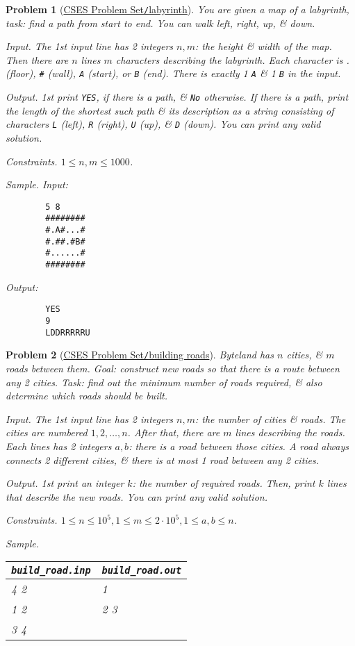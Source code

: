 \documentclass{article}
\newtheorem{problem}{Problem}
\begin{document}
\begin{problem}[\href{https://cses.fi/problemset/task/1193}{CSES Problem Set{\tt/}labyrinth}]
	You are given a map of a labyrinth, task: find a path from start to end. You can walk left, right, up, \& down.
	\item {\sf Input.} The 1st input line has 2 integers $n,m$: the height \& width of the map. Then there are $n$ lines $m$ characters describing the labyrinth. Each character is . (floor), {\tt\#} (wall), {\tt A} (start), or {\tt B} (end). There is exactly 1 {\tt A} \& 1 {\tt B} in the input.
	\item {\sf Output.} 1st print {\tt YES}, if there is a path, \& {\tt No} otherwise. If there is a path, print the length of the shortest such path \& its description as a string consisting of characters {\tt L} (left), {\tt R} (right), {\tt U} (up), \& {\tt D} (down). You can print any valid solution.
	\item {\sf Constraints.} $1\le n,m\le1000$.
	\item {\sf Sample.} Input:
	\begin{verbatim}
		5 8
		########
		#.A#...#
		#.##.#B#
		#......#
		########
	\end{verbatim}
	Output:
	\begin{verbatim}
		YES
		9
		LDDRRRRRU
	\end{verbatim}
\end{problem}

\begin{problem}[\href{https://cses.fi/problemset/task/1666}{CSES Problem Set{\tt/}building roads}]
	Byteland has $n$ cities, \& $m$ roads between them. Goal: construct new roads so that there is a route between any 2 cities. Task: find out the minimum number of roads required, \& also determine which roads should be built.
	\item {\sf Input.} The 1st input line has 2 integers $n,m$: the number of cities \& roads. The cities are numbered $1,2,\ldots,n$. After that, there are $m$ lines describing the roads. Each lines has 2 integers $a,b$: there is a road between those cities. A road always connects 2 different cities, \& there is at most 1 road between any 2 cities.
	\item {\sf Output.} 1st print an integer $k$: the number of required roads. Then, print $k$ lines that describe the new roads. You can print any valid solution.
	\item {\sf Constraints.} $1\le n\le10^5,1\le m\le2\cdot10^5,1\le a,b\le n$.
	\item {\sf Sample.}
	\begin{table}[H]
		\centering
		\begin{tabular}{|l|l|}
			\hline
			\verb|build_road.inp| & \verb|build_road.out| \\
			\hline
			4 2 & 1 \\
			1 2 & 2 3 \\
			3 4 &  \\
			\hline
		\end{tabular}
	\end{table}
\end{problem}
\end{document}
